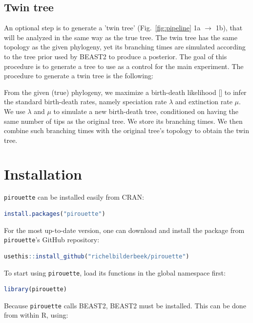 \documentclass{article}
\begin{document}
\subsection{Twin tree}

An optional step is to generate a 'twin tree' (Fig.~\ref{fig:pipeline} 1a $\rightarrow$ 1b), 
that will be analyzed in the same way as the true tree.
The twin tree has the same topology as the given phylogeny, 
yet its branching times are simulated according to 
the tree prior used by BEAST2 to produce a posterior.
The goal of this procedure is to generate a tree 
to use as a control for the main experiment.
The procedure to generate a twin tree is the following:

From the given (true) phylogeny, we maximize a birth-death 
likelihood [\cite{nee1994reconstructed}] to infer the standard 
birth-death rates, namely speciation rate $\lambda$ and extinction rate $\mu$.
We use $\lambda$ and $\mu$ to simulate a new birth-death tree, 
conditioned on having the same number of tips as the original tree. 
We store its branching times. 
We then combine such branching times with the original tree's 
topology to obtain the twin tree.

\section{Installation}

\verb;pirouette; can be installed easily from CRAN:

\begin{lstlisting}[language=R, floatplacement=H, frame=single]
install.packages("pirouette")
\end{lstlisting}

For the most up-to-date version, 
one can download and install the package from \verb;pirouette;'s GitHub repository:

\begin{lstlisting}[language=R, floatplacement=H, frame=single]
usethis::install_github("richelbilderbeek/pirouette")
\end{lstlisting}

To start using \verb;pirouette;, load its functions in the global namespace first:

\begin{lstlisting}[language=R, floatplacement=H, frame=single]
library(pirouette)
\end{lstlisting}
Because \verb;pirouette; calls BEAST2, BEAST2 must be installed. 
This can be done from within R, using:
\end{document}

